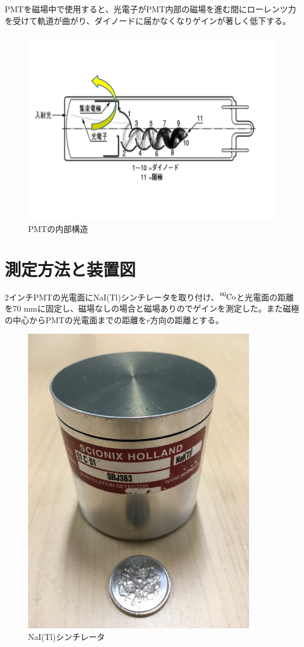 PMTを磁場中で使用すると、光電子がPMT内部の磁場を進む間にローレンツ力を受けて軌道が曲がり、ダイノードに届かなくなりゲインが著しく低下する。

\begin{figure}[H]
	\centering
		\includegraphics[width=12cm]{fig/iguchi/PMTinner.pdf}
	\caption{PMTの内部構造}
	\label{PMTinner}
\end{figure}



\section{測定方法と装置図}
2インチPMTの光電面にNaI(Tl)シンチレータを取り付け、$\ce{^{60}Co}$と光電面の距離を70 mmに固定し、磁場なしの場合と磁場ありのでゲインを測定した。また磁極の中心からPMTの光電面までの距離を$r$方向の距離とする。

\begin{figure}[htb]
	\centering
		\includegraphics[width=10cm]{fig/iguchi/NaIscinti.jpg}
	\caption{NaI(Tl)シンチレータ}
	\label{NaIscinti}
\end{figure}

